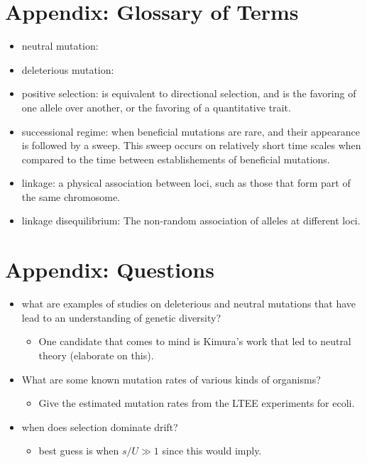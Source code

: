 \documentclass[12pt,twocolumn]{article}
\begin{document}
\section*{Appendix: Glossary of Terms}
\begin{itemize}
\item neutral mutation:
\item deleterious mutation:
\item positive selection: is equivalent to directional selection, and is the favoring of one allele over another, or the favoring of a quantitative trait.
\item successional regime: when beneficial mutations are rare, and their appearance is followed by a sweep.  This sweep occurs on relatively short time scales when compared to the time between establishements of beneficial mutations.
\item linkage: a physical association between loci, such as those that form part of the same chromosome.
\item linkage disequilibrium:  The non-random association of alleles at different loci.
\end{itemize}

\section*{Appendix: Questions}
\begin{itemize}
\item what are examples of studies on deleterious and neutral mutations that have lead to an understanding of genetic diversity?
	\begin{itemize}
	\item One candidate that comes to mind is Kimura's work that led to neutral theory (elaborate on this).
	\end{itemize}
\item What are some known mutation rates of various kinds of organisms?
	\begin{itemize}
	\item Give the estimated mutation rates from the LTEE experiments for ecoli.
	\end{itemize}
\item when does selection dominate drift?
	\begin{itemize}
	\item best guess is when $s/U \gg 1$ since this would imply.
	\end{itemize}
\end{itemize}


\end{document}
